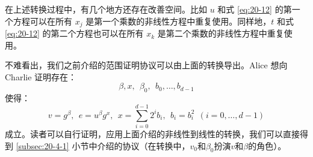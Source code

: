 在上述转换过程中，有几个地方还存在改善空间。比如 $u$ 和式 \ref{eq:20-12} 的第一个方程可以在所有 $x_j$ 是第一个乘数的非线性方程中重复使用。同样地，$t$ 和式 \ref{eq:20-12} 的第二个方程也可以在所有 $x_k$ 是第二个乘数的非线性方程中重复使用。

\begin{snote}[范围证明2.]
不难看出，我们之前介绍的范围证明协议可以由上面的转换导出。Alice 想向 Charlie 证明存在：
$$
\beta,x,~~
\beta_0,~~
b_0,\dots,b_{d-1}
$$
使得：
$$
v=g^\beta,~~
e=u^\beta g^x,~~
x=\sum_{i=0}^{d-1}2^ib_i,~~
b_i=b^2_i~~
(i=0,\dots,d-1)
$$
成立。读者可以自行证明，应用上面介绍的非线性到线性的转换，我们可以直接得到 \ref{subsec:20-4-1} 小节中介绍的协议（在转换中，$v_0$和$\beta_0$扮演$v$和$\beta$的角色）。
\end{snote}
